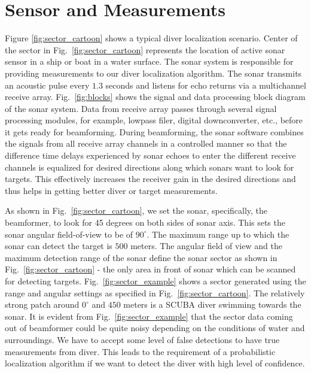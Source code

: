 \documentclass{article} %
\begin{document}
\section{Sensor and Measurements}
Figure \ref{fig:sector_cartoon} shows a typical diver localization scenario. Center of the sector
in Fig.~\ref{fig:sector_cartoon} represents
the location of active sonar sensor in a ship or boat in a water surface.  The sonar system is
responsible for providing measurements to our diver localization algorithm. The sonar transmits
an acoustic pulse every $1.3$ seconds and listens for echo returns via a multichannel receive array.
Fig.~\ref{fig:blocks} shows the signal and data processing block diagram of the sonar system. Data from receive
array passes through several signal processing modules, for example, lowpass filer, digital
downconverter, etc., before it gets ready for beamforming. During beamforming, the sonar software
combines the signals from all receive array channels in a controlled manner so that the difference
time delays experienced by sonar echoes to enter the different receive channels is equalized for
desired directions along which sonars want to look for targets. This effectively increases the
receiver gain in the desired directions and thus helps in getting better diver or target
measurements.

As shown in Fig.~\ref{fig:sector_cartoon}, we set the sonar, specifically, the beamformer, to look for 45 degrees
on both sides of sonar axis. This sets the sonar angular field-of-view to be of $90^{\circ}$.
The maximum range up to which the sonar can detect the target is $500$ meters. The angular
field of view and the maximum detection range of the sonar define the sonar sector as
shown in Fig.~\ref{fig:sector_cartoon} - the only area in front of sonar which can be scanned for detecting
targets. Fig.~\ref{fig:sector_example} shows a sector generated using the range and angular settings as
specified in Fig.~\ref{fig:sector_cartoon}. The relatively strong patch around $0^{\circ}$ and $450$ meters
is a SCUBA diver swimming towards the sonar. It is evident from Fig.~\ref{fig:sector_example} that the sector
data coming out of beamformer could be quite noisy depending on the conditions of water
and surroundings. We have to accept some level of false detections to have true measurements
from diver. This leads to the requirement of a probabilistic localization algorithm if we
want to detect the diver with high level of confidence.
\end{document}
